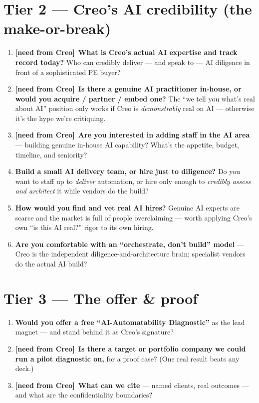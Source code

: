 \documentclass[11pt]{article}
\newcommand{\gap}{\textcolor{orange!85!black}{\textbf{[need from Creo]}}~}
\begin{document}
\section{Tier 2 --- Creo's AI credibility (the make-or-break)}
\begin{enumerate}[resume]
  \item \gap\textbf{What is Creo's actual AI expertise and track record today?} Who can credibly
  deliver --- and speak to --- AI diligence in front of a sophisticated PE buyer?
  \item \gap\textbf{Is there a genuine AI practitioner in-house, or would you acquire / partner /
  embed one?} The ``we tell you what's real about AI'' position only works if Creo is
  \emph{demonstrably} real on AI --- otherwise it's the hype we're critiquing.
  \item \gap\textbf{Are you interested in adding staff in the AI area} --- building genuine
  in-house AI capability? What's the appetite, budget, timeline, and seniority?
  \item \textbf{Build a small AI delivery team, or hire just to diligence?} Do you want to staff
  up to \emph{deliver} automation, or hire only enough to \emph{credibly assess and architect}
  it while vendors do the build?
  \item \textbf{How would you find and vet real AI hires?} Genuine AI experts are scarce and the
  market is full of people overclaiming --- worth applying Creo's own ``is this AI real?'' rigor
  to its own hiring.
  \item \textbf{Are you comfortable with an ``orchestrate, don't build'' model} --- Creo is the
  independent diligence-and-architecture brain; specialist vendors do the actual AI build?
\end{enumerate}

\section{Tier 3 --- The offer \& proof}
\begin{enumerate}[resume]
  \item \textbf{Would you offer a free ``AI-Automatability Diagnostic''} as the lead magnet ---
  and stand behind it as Creo's signature?
  \item \gap\textbf{Is there a target or portfolio company we could run a pilot diagnostic on,}
  for a proof case? (One real result beats any deck.)
  \item \gap\textbf{What can we cite} --- named clients, real outcomes --- and what are the
  confidentiality boundaries?
\end{enumerate}
\end{document}
